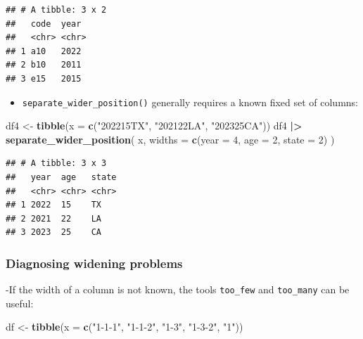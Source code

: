 \documentclass[
]{article}
\newenvironment{Shaded}{\begin{snugshade}}{\end{snugshade}}
\newcommand{\AttributeTok}[1]{\textcolor[rgb]{0.13,0.29,0.53}{#1}}
\newcommand{\DecValTok}[1]{\textcolor[rgb]{0.00,0.00,0.81}{#1}}
\newcommand{\FunctionTok}[1]{\textcolor[rgb]{0.13,0.29,0.53}{\textbf{#1}}}
\newcommand{\NormalTok}[1]{#1}
\newcommand{\OtherTok}[1]{\textcolor[rgb]{0.56,0.35,0.01}{#1}}
\newcommand{\SpecialCharTok}[1]{\textcolor[rgb]{0.81,0.36,0.00}{\textbf{#1}}}
\newcommand{\StringTok}[1]{\textcolor[rgb]{0.31,0.60,0.02}{#1}}
\providecommand{\tightlist}{%
  \setlength{\itemsep}{0pt}\setlength{\parskip}{0pt}}
\begin{document}
\begin{verbatim}
## # A tibble: 3 x 2
##   code  year 
##   <chr> <chr>
## 1 a10   2022 
## 2 b10   2011 
## 3 e15   2015
\end{verbatim}

\begin{itemize}
\tightlist
\item
  \texttt{separate\_wider\_position()} generally requires a known fixed
  set of columns:
\end{itemize}

\begin{Shaded}
\begin{Highlighting}[]
\NormalTok{df4 }\OtherTok{\textless{}{-}} \FunctionTok{tibble}\NormalTok{(}\AttributeTok{x =} \FunctionTok{c}\NormalTok{(}\StringTok{"202215TX"}\NormalTok{, }\StringTok{"202122LA"}\NormalTok{, }\StringTok{"202325CA"}\NormalTok{))}
\NormalTok{df4 }\SpecialCharTok{|\textgreater{}} 
  \FunctionTok{separate\_wider\_position}\NormalTok{(}
\NormalTok{    x,}
    \AttributeTok{widths =} \FunctionTok{c}\NormalTok{(}\AttributeTok{year =} \DecValTok{4}\NormalTok{, }\AttributeTok{age =} \DecValTok{2}\NormalTok{, }\AttributeTok{state =} \DecValTok{2}\NormalTok{)}
\NormalTok{  )}
\end{Highlighting}
\end{Shaded}

\begin{verbatim}
## # A tibble: 3 x 3
##   year  age   state
##   <chr> <chr> <chr>
## 1 2022  15    TX   
## 2 2021  22    LA   
## 3 2023  25    CA
\end{verbatim}

\subsubsection{Diagnosing widening
problems}\label{diagnosing-widening-problems}

-If the width of a column is not known, the tools \texttt{too\_few} and
\texttt{too\_many} can be useful:

\begin{Shaded}
\begin{Highlighting}[]
\NormalTok{df }\OtherTok{\textless{}{-}} \FunctionTok{tibble}\NormalTok{(}\AttributeTok{x =} \FunctionTok{c}\NormalTok{(}\StringTok{"1{-}1{-}1"}\NormalTok{, }\StringTok{"1{-}1{-}2"}\NormalTok{, }\StringTok{"1{-}3"}\NormalTok{, }\StringTok{"1{-}3{-}2"}\NormalTok{, }\StringTok{"1"}\NormalTok{))}
\end{Highlighting}
\end{Shaded}
\end{document}
